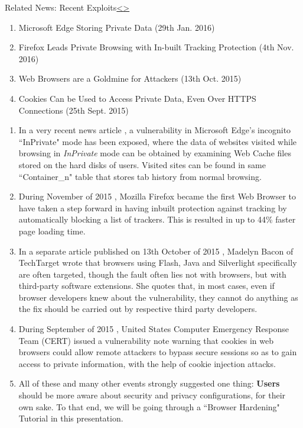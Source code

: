 \documentclass[12pt]{extarticle}
\newenvironment{instructionblock}{\Large\bgroup}{\egroup}
\begin{document}
	\pagebreak
	\begin{slide}{Related News: Recent Exploits}{\hyperref[slide 5]{\textless}\hyperref[slide 7]{\textgreater}}
		\begin{instructionblock}
			\begin{enumerate}
				\item Microsoft Edge Storing Private Data (29th Jan. 2016) \cite{edgenews}
				\item Firefox Leads Private Browsing with In-built Tracking Protection (4th Nov. 2016) \cite{ffnews}
				\item Web Browsers are a Goldmine for Attackers (13th Oct. 2015) \cite{goldnews}
				\item Cookies Can be Used to Access Private Data, Even Over HTTPS Connections (25th Sept. 2015) \cite{cooknews}
			\end{enumerate}
		\end{instructionblock}
	\end{slide}
	\vfill
	
	\begin{enumerate}
		
	\item In a very recent news article \cite{edgenews}, a vulnerability in Microsoft Edge's incognito ``InPrivate" mode has been exposed, where the data of websites visited while browsing in \textit{InPrivate} mode can be obtained by examining Web Cache files stored on the hard disks of users. Visited sites can be found in same ``Container\_n" table that stores tab history from normal browsing.
	
	
	\item During November of 2015 \cite{ffnews}, Mozilla Firefox became the first Web Browser to have taken a step forward in having inbuilt protection against tracking by automatically blocking a list of trackers. This is resulted in up to 44\% faster page loading time.
	
	
	\item In a separate article published on 13th October of 2015 \cite{goldnews}, Madelyn Bacon of TechTarget wrote that browsers using Flash, Java and Silverlight specifically are often targeted, though the fault often lies not with browsers, but with third-party software extensions. She quotes that, in most cases, even if browser developers knew about the vulnerability, they cannot do anything as the fix should be carried out by respective third party developers.
	
	
	\item During September of 2015 \cite{cooknews}, United States Computer Emergency Response Team (CERT) issued a vulnerability note warning that cookies in web browsers could allow remote attackers to bypass secure sessions so as to gain access to private information, with the help of cookie injection attacks.
	
	
	\item All of these and many other events strongly suggested one thing: \textbf{Users} should be more aware about security and privacy configurations, for their own sake. To that end, we will be going through a ``Browser Hardening" Tutorial in this presentation.
	\end{enumerate}
	
\end{document}
